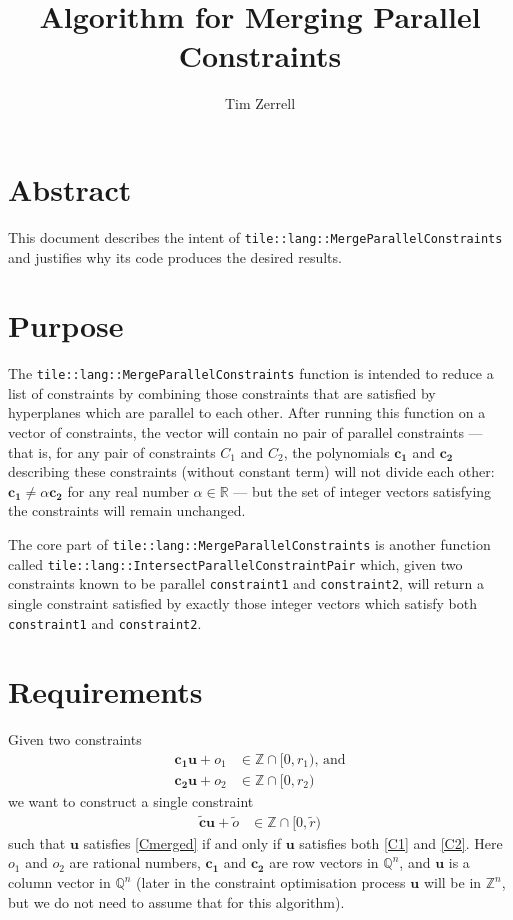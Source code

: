 \documentclass[11pt]{article}
\title{Algorithm for Merging Parallel Constraints}
\author{Tim Zerrell}
\newcommand{\vect}[1]{\mathbf{#1}}
\newcommand{\cc}{::\allowbreak }
\begin{document}
\maketitle

\tableofcontents

\section{Abstract}

This document describes the intent of \texttt{tile\cc lang\cc MergeParallelConstraints} and justifies why its code produces the desired results.

\section{Purpose}

The \texttt{tile\cc lang\cc MergeParallelConstraints} function is intended to reduce a list of constraints by combining those constraints that are satisfied by hyperplanes which are parallel to each other. After running this function on a vector of constraints, the vector will contain no pair of parallel constraints --- that is, for any pair of constraints $C_1$ and $C_2$, the polynomials $\vect{c_1}$ and $\vect{c_2}$ describing these constraints (without constant term) will not divide each other: $\vect{c_1} \neq \alpha \vect{c_2}$ for any real number $\alpha\in\mathbb{R}$ --- but the set of integer vectors satisfying the constraints will remain unchanged.

The core part of \texttt{tile\cc lang\cc MergeParallelConstraints} is another function called \texttt{tile\cc lang\cc IntersectParallelConstraintPair} which, given two constraints known to be parallel \texttt{constraint1} and \texttt{constraint2}, will return a single constraint satisfied by exactly those integer vectors which satisfy both \texttt{constraint1} and \texttt{constraint2}.

\section{Requirements}

Given two constraints
\begin{align}
\vect{c_1} \vect{u} + o_1 &\in \mathbb{Z} \cap [0, r_1)\text{, and} \label{C1} \\
\vect{c_2} \vect{u} + o_2 &\in \mathbb{Z} \cap [0, r_2) \label{C2}
\end{align}
we want to construct a single constraint
\begin{align}
\vect{\widetilde{c}} \vect{u} + \widetilde{o} &\in \mathbb{Z} \cap [0, \widetilde{r}) \label{Cmerged}
\end{align}
such that $\vect{u}$ satisfies \eqref{Cmerged} if and only if $\vect{u}$ satisfies both \eqref{C1} and \eqref{C2}. Here $o_1$ and $o_2$ are rational numbers, $\vect{c_1}$ and $\vect{c_2}$ are row vectors in $\mathbb{Q}^n$, and $\vect{u}$ is a column vector in $\mathbb{Q}^n$ (later in the constraint optimisation process $\vect{u}$ will be in $\mathbb{Z}^n$, but we do not need to assume that for this algorithm).
\end{document}

